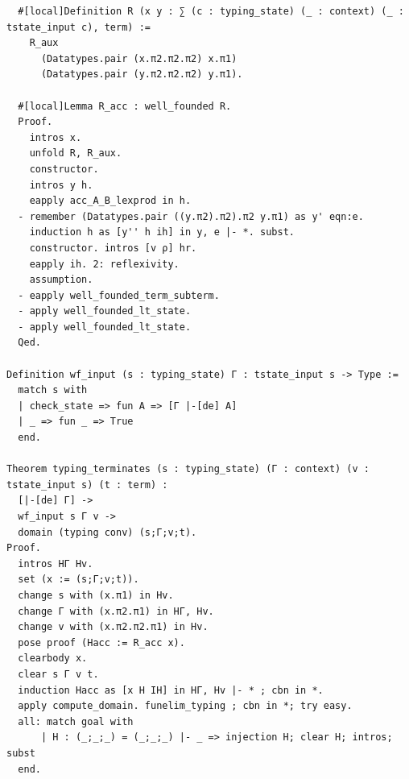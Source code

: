 \documentclass[10pt,a4paper]{amsart}
\begin{document}
\begin{lstlisting}
  #[local]Definition R (x y : ∑ (c : typing_state) (_ : context) (_ : tstate_input c), term) :=
    R_aux
      (Datatypes.pair (x.π2.π2.π2) x.π1)
      (Datatypes.pair (y.π2.π2.π2) y.π1).
  
  #[local]Lemma R_acc : well_founded R.
  Proof.
    intros x.
    unfold R, R_aux.
    constructor.
    intros y h.
    eapply acc_A_B_lexprod in h.
  - remember (Datatypes.pair ((y.π2).π2).π2 y.π1) as y' eqn:e.
    induction h as [y'' h ih] in y, e |- *. subst.
    constructor. intros [v ρ] hr.
    eapply ih. 2: reflexivity.
    assumption.
  - eapply well_founded_term_subterm.
  - apply well_founded_lt_state.
  - apply well_founded_lt_state. 
  Qed.

Definition wf_input (s : typing_state) Γ : tstate_input s -> Type :=
  match s with
  | check_state => fun A => [Γ |-[de] A]
  | _ => fun _ => True
  end.

Theorem typing_terminates (s : typing_state) (Γ : context) (v : tstate_input s) (t : term) :
  [|-[de] Γ] ->
  wf_input s Γ v ->
  domain (typing conv) (s;Γ;v;t).
Proof.
  intros HΓ Hv.
  set (x := (s;Γ;v;t)).
  change s with (x.π1) in Hv.
  change Γ with (x.π2.π1) in HΓ, Hv.
  change v with (x.π2.π2.π1) in Hv.
  pose proof (Hacc := R_acc x).
  clearbody x.
  clear s Γ v t.
  induction Hacc as [x H IH] in HΓ, Hv |- * ; cbn in *.
  apply compute_domain. funelim_typing ; cbn in *; try easy.
  all: match goal with 
      | H : (_;_;_) = (_;_;_) |- _ => injection H; clear H; intros; subst
  end.


\end{lstlisting}
\end{document}
